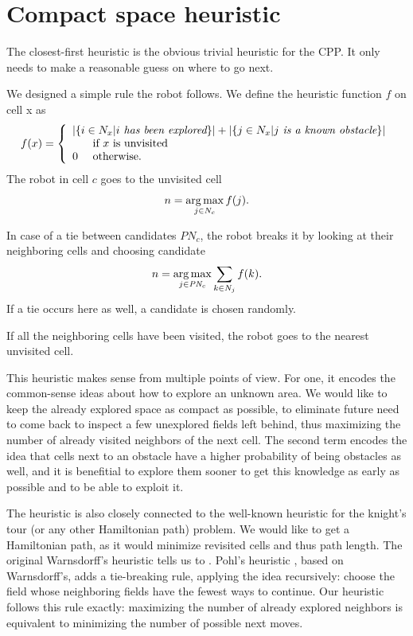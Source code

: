 \documentclass[buriama8_dp.tex]{subfiles}
\begin{document}
\section{Compact space heuristic}
\label{sec:my_heuristic}

The closest-first heuristic is the obvious trivial heuristic for the CPP. It only needs to make a reasonable guess on where to go next. 

We designed a simple rule the robot follows. We define the heuristic function \(f\) on cell \m x as 
\[
f(x)= \left\{
    \begin{array}{l}
      |\{i \in N_x | i \textit{ has been explored}\}| + |\{j \in N_x | j \textit{ is a known obstacle}\}| \\
      \hphantom{0} \quad \textrm{ if }x\textrm{ is unvisited} \\
      0 \quad \textrm{ otherwise.}
    \end{array}
    \right.
\]
The robot in cell \(c\) goes to the unvisited cell
\[n = \operatorname*{arg\,max}_{j \in N_c} f(j).\]

In case of a tie between candidates \(\textit{PN}_c\), the robot breaks it by looking at their neighboring cells and choosing candidate
\[
n = \operatorname*{arg\,max}_{j \in \textit{PN}_c} \sum_{k \in N_j} f(k).
\]
If a tie occurs here as well, a candidate is chosen randomly.

If all the neighboring cells have been visited, the robot goes to the nearest unvisited cell.

This heuristic makes sense from multiple points of view. For one, it encodes the common-sense ideas about how to explore an unknown area. We would like to keep the already explored space as compact as possible, to eliminate future need to come back to inspect a few unexplored fields left behind, thus maximizing the number of already visited neighbors of the next cell. The second term encodes the idea that cells next to an obstacle have a higher probability of being obstacles as well, and it is benefitial to explore them sooner to get this knowledge as early as possible and to be able to exploit it.

The heuristic is also closely connected to the well-known heuristic for the knight's tour (or any other Hamiltonian path) problem. We would like to get a Hamiltonian path, as it would minimize revisited cells and thus path length. The original Warnsdorff's heuristic tells us to . Pohl's heuristic \cite{knight_heuristic}, based on Warnsdorff's, adds a tie-breaking rule, applying the idea recursively: choose the field whose neighboring fields have the fewest ways to continue. Our heuristic follows this rule exactly: maximizing the number of already explored neighbors is equivalent to minimizing the number of possible next moves.
\end{document}
